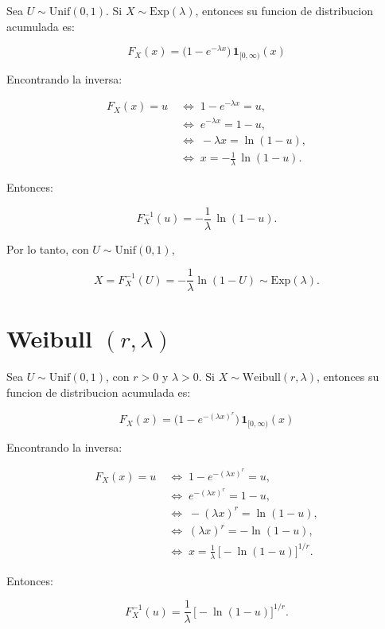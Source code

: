 \documentclass[11pt]{article}
\begin{document}
    Sea \textbf{\(U\sim\mathrm{Unif}(0,1)\)}. Si
\(X\sim\mathrm{Exp}(\lambda)\), entonces su funcion de distribucion
acumulada es:

\[
F_X(x)=\bigl(1-e^{-\lambda x}\bigr)\,\mathbf{1}_{[0,\infty)}(x)
\]

Encontrando la inversa:

\[
\begin{aligned}
F_X(x)=u &\;\iff\; 1-e^{-\lambda x}=u,\\
         &\;\iff\; e^{-\lambda x}=1-u,\\
         &\;\iff\; -\lambda x=\ln(1-u),\\
         &\;\iff\; x=-\frac{1}{\lambda}\,\ln(1-u).
\end{aligned}
\]

Entonces:

\[
F_X^{-1}(u)=-\frac{1}{\lambda}\,\ln(1-u).
\]

Por lo tanto, con \(U\sim\mathrm{Unif}(0,1)\),

\[
X=F_X^{-1}(U)=-\frac{1}{\lambda}\ln(1-U)\sim\mathrm{Exp}(\lambda).
\]

    \hypertarget{weibull-rlambda}{%
\section{\texorpdfstring{Weibull
\((r,\lambda)\)}{Weibull (r,\textbackslash lambda)}}\label{weibull-rlambda}}

    Sea \textbf{\(U\sim\mathrm{Unif}(0,1)\)}, con \(r>0\) y \(\lambda>0\).
Si \(X\sim\mathrm{Weibull}(r,\lambda)\), entonces su funcion de
distribucion acumulada es:

\[
F_X(x)=\bigl(1-e^{-(\lambda x)^r}\bigr)\,\mathbf{1}_{[0,\infty)}(x)
\]

Encontrando la inversa:

\[
\begin{aligned}
F_X(x)=u &\;\iff\; 1-e^{-(\lambda x)^r}=u,\\
         &\;\iff\; e^{-(\lambda x)^r}=1-u,\\
         &\;\iff\; -(\lambda x)^r=\ln(1-u),\\
         &\;\iff\; (\lambda x)^r=-\ln(1-u),\\
         &\;\iff\; x=\frac{1}{\lambda}\,\bigl[-\ln(1-u)\bigr]^{1/r}.
\end{aligned}
\]

Entonces:

\[
F_X^{-1}(u)=\frac{1}{\lambda}\,\bigl[-\ln(1-u)\bigr]^{1/r}.
\]
\end{document}

